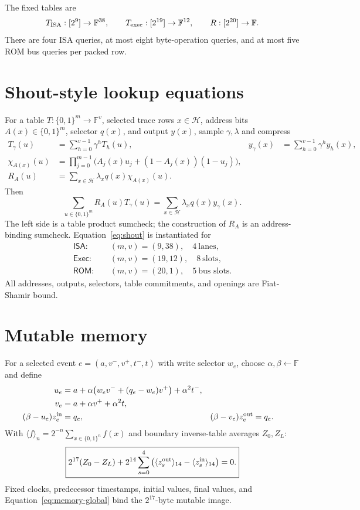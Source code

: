 \documentclass[10pt]{article}
\numberwithin{equation}{section}
\newcommand{\F}{\mathbb{F}}
\newcommand{\B}{\{0,1\}}
\begin{document}
The fixed tables are
\begin{equation}
 T_{\rm ISA}:[2^9]\to\F^{38},\qquad
 T_{\rm exec}:[2^{19}]\to\F^{12},\qquad
 R:[2^{20}]\to\F.
 \label{eq:tables}
\end{equation}
There are four ISA queries, at most eight byte-operation queries, and at most five ROM bus
queries per packed row.

\section{Shout-style lookup equations}

For a table $T:\B^m\to\F^v$, selected trace rows $x\in\mathcal H$, address bits
$A(x)\in\B^m$, selector $q(x)$, and output $y(x)$, sample $\gamma,\lambda$ and compress
\begin{align}
 T_\gamma(u)&=\sum_{h=0}^{v-1}\gamma^hT_h(u),
 &y_\gamma(x)&=\sum_{h=0}^{v-1}\gamma^hy_h(x),\\
 \chi_{A(x)}(u)&=\prod_{j=0}^{m-1}
 \bigl(A_j(x)u_j+(1-A_j(x))(1-u_j)\bigr),\\
 R_A(u)&=\sum_{x\in\mathcal H}\lambda_xq(x)\chi_{A(x)}(u).
\end{align}
Then
\begin{equation}
 \boxed{
 \sum_{u\in\B^m}R_A(u)T_\gamma(u)
 =\sum_{x\in\mathcal H}\lambda_xq(x)y_\gamma(x)}.
 \label{eq:shout}
\end{equation}
The left side is a table product sumcheck; the construction of $R_A$ is an address-binding
sumcheck.  Equation~\eqref{eq:shout} is instantiated for
\begin{align}
 \mathsf{ISA}:&\quad (m,v)=(9,38),\quad 4\ \text{lanes},\\
 \mathsf{Exec}:&\quad (m,v)=(19,12),\quad 8\ \text{slots},\\
 \mathsf{ROM}:&\quad (m,v)=(20,1),\quad 5\ \text{bus slots}.
\end{align}
All addresses, outputs, selectors, table commitments, and openings are Fiat-Shamir bound.

\section{Mutable memory}

For a selected event $e=(a,v^-,v^+,t^-,t)$ with write selector $w_e$, choose
$\alpha,\beta\leftarrow\F$ and define
\begin{align}
 u_e&=a+\alpha\bigl(w_ev^-+(q_e-w_e)v^+\bigr)+\alpha^2t^-,\\
 v_e&=a+\alpha v^++\alpha^2t,\\
 (\beta-u_e)z_e^{\rm in}&=q_e,
 &(\beta-v_e)z_e^{\rm out}&=q_e.
 \label{eq:memory-local}
\end{align}
With $\langle f\rangle_n=2^{-n}\sum_{x\in\B^n}f(x)$ and boundary inverse-table
averages $Z_0,Z_L$:
\begin{equation}
 \boxed{2^{17}(Z_0-Z_L)+2^{14}
 \sum_{s=0}^{4}\left(\langle z_s^{\rm out}\rangle_{14}
                         -\langle z_s^{\rm in}\rangle_{14}\right)=0.}
 \label{eq:memory-global}
\end{equation}
Fixed clocks, predecessor timestamps, initial values, final values, and
Equation~\eqref{eq:memory-global} bind the $2^{17}$-byte mutable image.
\end{document}
